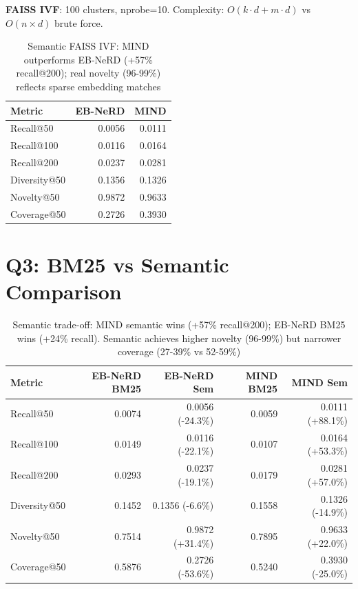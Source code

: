 \documentclass[11pt,a4paper]{article}
\begin{document}
\textbf{FAISS IVF}: 100 clusters, nprobe=10. Complexity: $O(k \cdot d + m \cdot d)$ vs $O(n \times d)$ brute force.

\begin{table}[H]
\centering\small
\begin{tabular}{lrr}
\toprule
\textbf{Metric} & \textbf{EB-NeRD} & \textbf{MIND} \\
\midrule
Recall@50 & 0.0056 & 0.0111 \\
Recall@100 & 0.0116 & 0.0164 \\
Recall@200 & 0.0237 & 0.0281 \\
Diversity@50 & 0.1356 & 0.1326 \\
Novelty@50 & 0.9872 & 0.9633 \\
Coverage@50 & 0.2726 & 0.3930 \\
\bottomrule
\end{tabular}
\caption{Semantic FAISS IVF: MIND outperforms EB-NeRD (+57\% recall@200); real novelty (96-99\%) reflects sparse embedding matches}
\end{table}

\section*{Q3: BM25 vs Semantic Comparison}

\begin{table}[H]
\centering\small
\begin{tabular}{lrrrr}
\toprule
\textbf{Metric} & \textbf{EB-NeRD BM25} & \textbf{EB-NeRD Sem} & \textbf{MIND BM25} & \textbf{MIND Sem} \\
\midrule
Recall@50 & 0.0074 & 0.0056 (-24.3\%) & 0.0059 & 0.0111 (+88.1\%) \\
Recall@100 & 0.0149 & 0.0116 (-22.1\%) & 0.0107 & 0.0164 (+53.3\%) \\
Recall@200 & 0.0293 & 0.0237 (-19.1\%) & 0.0179 & 0.0281 (+57.0\%) \\
Diversity@50 & 0.1452 & 0.1356 (-6.6\%) & 0.1558 & 0.1326 (-14.9\%) \\
Novelty@50 & 0.7514 & 0.9872 (+31.4\%) & 0.7895 & 0.9633 (+22.0\%) \\
Coverage@50 & 0.5876 & 0.2726 (-53.6\%) & 0.5240 & 0.3930 (-25.0\%) \\
\bottomrule
\end{tabular}
\caption{Semantic trade-off: MIND semantic wins (+57\% recall@200); EB-NeRD BM25 wins (+24\% recall). Semantic achieves higher novelty (96-99\%) but narrower coverage (27-39\% vs 52-59\%)}
\end{table}
\end{document}
